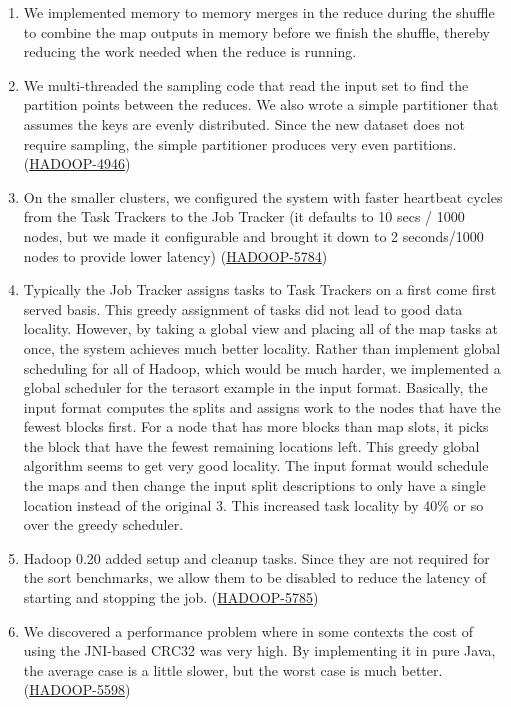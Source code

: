 \documentclass{article}
\begin{document}
\begin{enumerate}
\item We implemented memory to memory merges in the reduce during the
  shuffle to combine the map outputs in memory before we finish the
  shuffle, thereby reducing the work needed when the reduce is
  running.

\item We multi-threaded the sampling code that read the input set to
  find the partition points between the reduces. We also wrote a
  simple partitioner that assumes the keys are evenly
  distributed. Since the new dataset does not require sampling, the
  simple partitioner produces very even partitions.
  (\href{http://issues.apache.org/jira/browse/HADOOP-4946}{HADOOP-4946})

\item On the smaller clusters, we configured the system with faster
  heartbeat cycles from the Task Trackers to the Job Tracker (it
  defaults to 10 secs / 1000 nodes, but we made it configurable and
  brought it down to 2 seconds/1000 nodes to provide lower latency)
  (\href{http://issues.apache.org/jira/browse/HADOOP-5784}{HADOOP-5784})

\item Typically the Job Tracker assigns tasks to Task Trackers on a
  first come first served basis. This greedy assignment of tasks did
  not lead to good data locality. However, by taking a global view and
  placing all of the map tasks at once, the system achieves much better
  locality. Rather than implement global scheduling for all of Hadoop,
  which would be much harder, we implemented a global scheduler for
  the terasort example in the input format. Basically, the input
  format computes the splits and assigns work to the nodes that have
  the fewest blocks first. For a node that has more blocks
  than map slots, it picks the block that have the fewest remaining
  locations left. This greedy global algorithm seems to get very good
  locality. The input format would schedule the maps and then change
  the input split descriptions to only have a single location instead
  of the original 3. This increased task locality by 40\% or so over
  the greedy scheduler.

\item Hadoop 0.20 added setup and cleanup tasks. Since they are not
  required for the sort benchmarks, we allow them to be disabled to
  reduce the latency of starting and stopping the job.
  (\href{http://issues.apache.org/jira/browse/HADOOP-5785}{HADOOP-5785})

\item We discovered a performance problem where in some contexts the
  cost of using the JNI-based CRC32 was very high. By implementing it
  in pure Java, the average case is a little slower, but the worst
  case is much better.
  (\href{http://issues.apache.org/jira/browse/HADOOP-5598}{HADOOP-5598})


\end{enumerate}
\end{document}
